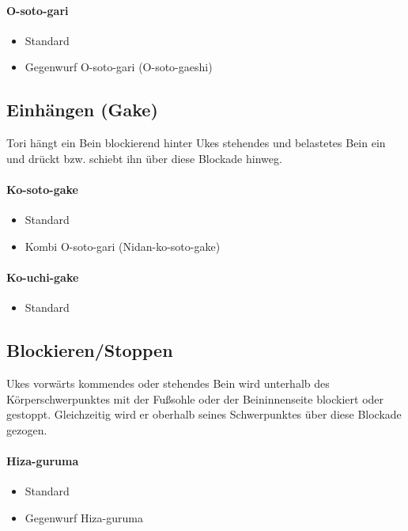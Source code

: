 \documentclass[justified, a4paper, notitlepage, captions=tableheading, nobib]{tufte-handout}
\begin{document}
\paragraph{O-soto-gari }
\label{sec:org7a48e59}
\begin{itemize}
\item Standard
\item Gegenwurf O-soto-gari (O-soto-gaeshi)
\end{itemize}

\subsection{Einhängen (Gake) }
\label{sec:org60ceabf}
Tori hängt ein Bein blockierend hinter Ukes stehendes und belastetes Bein ein und drückt bzw. schiebt ihn über diese Blockade hinweg.

\paragraph{Ko-soto-gake }
\label{sec:org0b81b8d}
\begin{itemize}
\item Standard
\item Kombi O-soto-gari (Nidan-ko-soto-gake)
\end{itemize}

\paragraph{Ko-uchi-gake }
\label{sec:org46edc21}
\begin{itemize}
\item Standard
\end{itemize}

\subsection{Blockieren/Stoppen }
\label{sec:org0354d93}
Ukes vorwärts kommendes oder stehendes Bein wird unterhalb des Körperschwerpunktes mit der Fußsohle oder der Beininnenseite blockiert oder gestoppt. Gleichzeitig wird er oberhalb seines Schwerpunktes über diese Blockade gezogen.

\paragraph{Hiza-guruma }
\label{sec:org81d697d}
\begin{itemize}
\item Standard
\item Gegenwurf Hiza-guruma
\end{itemize}
\end{document}
